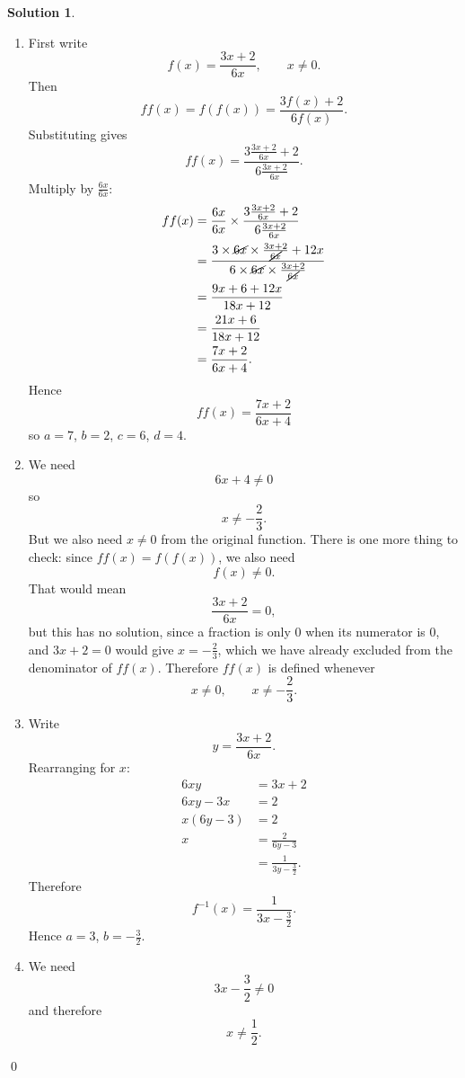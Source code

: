 \documentclass[a4paper]{article}
\theoremstyle{plain}
\theoremstyle{definition}
\newtheorem*{solution}{Solution}
\numberwithin{equation}{subsection}
\begin{document}
\begin{solution}

\begin{enumerate}
    \item First write
    \[
        f(x) = \frac{3x+2}{6x}, \qquad x \neq 0.
    \]
    Then
    \[
        ff(x) = f(f(x)) = \frac{3f(x)+2}{6f(x)}.
    \]
    Substituting gives
    \[
        ff(x) = \frac{3\frac{3x+2}{6x}+2}{6\frac{3x+2}{6x}}.
    \]
    Multiply by $\frac{6x}{6x}$:
    \begin{align*}
        ff(x)
        &= \frac{6x}{6x}\times \frac{3\frac{3x+2}{6x}+2}{6\frac{3x+2}{6x}}\\
        &= \frac{3\times\cancel{6x}\times\frac{3x+2}{\cancel{6x}}+12x}{6\times\cancel{6x}\times\frac{3x+2}{\cancel{6x}}}\\
        &= \frac{9x+6+12x}{18x+12}\\
        &= \frac{21x+6}{18x+12}\\
        &= \frac{7x+2}{6x+4}.
    \end{align*}
    Hence
    \[
        ff(x) = \frac{7x+2}{6x+4}
    \]
    so $a=7$, $b=2$, $c=6$, $d=4$.

    \item We need
    \[
        6x+4 \neq 0
    \]
    so
    \[
        x \neq -\frac{2}{3}.
    \]
    But we also need $x \neq 0$ from the original function. There is one more thing to check: since $ff(x)=f(f(x))$, we also need
    \[
        f(x) \neq 0.
    \]
    That would mean
    \[
        \frac{3x+2}{6x} = 0,
    \]
    but this has no solution, since a fraction is only $0$ when its numerator is $0$, and $3x+2=0$ would give $x=-\frac{2}{3}$, which we have already excluded from the denominator of $ff(x)$.
    Therefore $ff(x)$ is defined whenever
    \[
        x \neq 0, \qquad x \neq -\frac{2}{3}.
    \]

    \item Write
    \[
        y = \frac{3x+2}{6x}.
    \]
    Rearranging for $x$:
    \begin{align*}
        6xy &= 3x+2\\
        6xy-3x &= 2\\
        x(6y-3) &= 2\\
        x &= \frac{2}{6y-3}\\
        &= \frac{1}{3y-\frac{3}{2}}.
    \end{align*}
    Therefore
    \[
        f^{-1}(x) = \frac{1}{3x-\frac{3}{2}}.
    \]
    Hence $a=3$, $b=-\frac{3}{2}$.

    \item We need
    \[
        3x-\frac{3}{2} \neq 0
    \]
    and therefore
    \[
        x \neq \frac{1}{2}.
    \]
\end{enumerate}
\qed
\end{solution}
\end{document}
